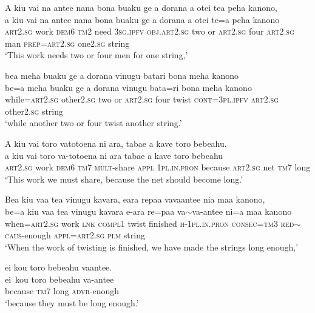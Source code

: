 \newpage
\ea\label{ex:text20-10}
A kiu vai na antee nana bona buaku ge a dorana a otei tea peha kanono,\\
\gll a	kiu	vai	na	antee	nana	bona	buaku	ge	a	dorana	a	otei	te=a	peha	kanono\\
     \textsc{art}2.\textsc{sg}	work	\textsc{dem}6	\textsc{tm}2	need	3\textsc{sg}.\textsc{ipfv}	\textsc{obj}.\textsc{art}2.\textsc{sg}	two	or	\textsc{art}2.\textsc{sg}	four	\textsc{art}2.\textsc{sg}	man	\textsc{prep}=\textsc{art}2.\textsc{sg}	one2.\textsc{sg}	string\\
\glt `This work needs two or four men for one string,'
\z

\ea\label{ex:text20-11}
bea meha buaku ge a dorana vinugu batari bona meha kanono\\
\gll be=a	meha	buaku	ge	a	dorana	vinugu	bata=ri	bona	meha	kanono\\
     while=\textsc{art}2.\textsc{sg}	other2.\textsc{sg}	two	or	\textsc{art}2.\textsc{sg}	four	twist	\textsc{cont}=3\textsc{pl}.\textsc{ipfv}	\textsc{art}2.\textsc{sg}	other2.\textsc{sg}	string\\
\glt `while another two or four twist another string.'
\z

\ea\label{ex:text20-12}
A kiu vai toro vatotoena ni ara, tabae a kave toro bebeahu.\\
\gll a	kiu	vai	toro	va-totoena	ni	ara	tabae	a	kave	toro	bebeahu\\
     \textsc{art}2.\textsc{sg}	work	\textsc{dem}6	\textsc{tm}7	\textsc{mult}-share	\textsc{appl}	1\textsc{pl}.\textsc{in}.\textsc{pron}	because	\textsc{art}2.\textsc{sg}	net	\textsc{tm}7	long\\
\glt `This work we must share, because the net should become long.'
\z

\ea\label{ex:text20-13}
Bea kiu vaa tea vinugu kavara, eara repaa vavaantee nia maa kanono,\\
\gll be=a	kiu	vaa	tea	vinugu	kavara	e-ara	re=paa	va{$\sim$}va-antee	ni=a	maa	kanono\\
     when=\textsc{art}2.\textsc{sg}	work	\textsc{lnk}	\textsc{compl}1	twist	finished	\textsc{h}-1\textsc{pl}.\textsc{in}.\textsc{pron}	\textsc{consec}=\textsc{tm}3	\textsc{red}{$\sim$}\textsc{caus}-enough	\textsc{appl}=\textsc{art}2.\textsc{sg}	\textsc{plm}	string\\
\glt `When the work of twisting is finished, we have made the strings long enough,'
\z

\ea\label{ex:text20-14}
ei kou toro bebeahu vaantee.\\
\gll ei~kou	toro	bebeahu	va-antee\\
     because	\textsc{tm}7	long	\textsc{advr}-enough\\
\glt `because they must be long enough.'
\z

